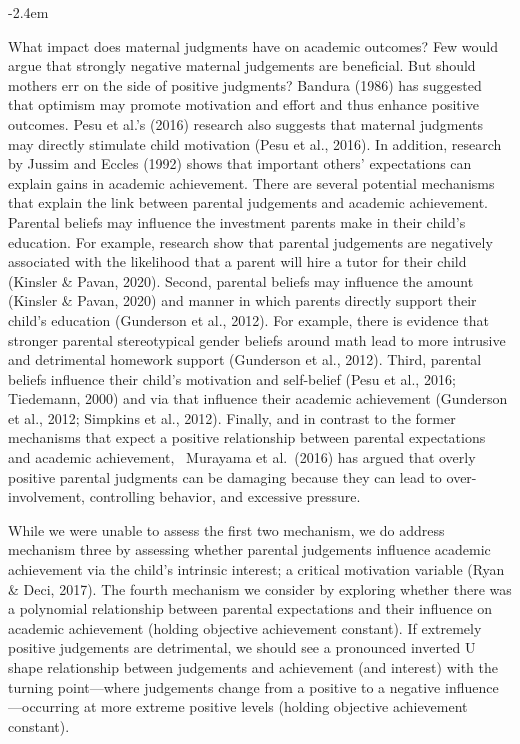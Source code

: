 \documentclass[]{article}
\renewenvironment{quote}{\begin{fquote}\advance\leftmargini -2.4em\begin{oldquote}}{\end{oldquote}\end{fquote}}
\newenvironment{fquote}
  {\def\FrameCommand{
	\fboxsep=0.6em %
	\fcolorbox{black}{white}}%
    \MakeFramed {\advance\hsize-2\width \FrameRestore}
    \begin{minipage}{\linewidth}
  }
  {\end{minipage}\endMakeFramed}
\begin{document}
\begin{quote}
What impact does maternal judgments have on academic outcomes? Few would argue that strongly negative maternal judgements are beneficial. But should mothers err on the side of positive judgments? Bandura (1986) has suggested that optimism may promote motivation and effort and thus enhance positive outcomes. Pesu et al.'s (2016) research also suggests that maternal judgments may directly stimulate child motivation (Pesu et al., 2016). In addition, research by Jussim and Eccles (1992) shows that important others' expectations can explain gains in academic achievement. There are several potential mechanisms that explain the link between parental judgements and academic achievement. Parental beliefs may influence the investment parents make in their child's education. For example, research show that parental judgements are negatively associated with the likelihood that a parent will hire a tutor for their child (Kinsler \& Pavan, 2020). Second, parental beliefs may influence the amount (Kinsler \& Pavan, 2020) and manner in which parents directly support their child's education (Gunderson et al., 2012). For example, there is evidence that stronger parental stereotypical gender beliefs around math lead to more intrusive and detrimental homework support (Gunderson et al., 2012). Third, parental beliefs influence their child's motivation and self-belief (Pesu et al., 2016; Tiedemann, 2000) and via that influence their academic achievement (Gunderson et al., 2012; Simpkins et al., 2012). Finally, and in contrast to the former mechanisms that expect a positive relationship between parental expectations and academic achievement,~ Murayama et al.~(2016) has argued that overly positive parental judgments can be damaging because they can lead to over-involvement, controlling behavior, and excessive pressure.

While we were unable to assess the first two mechanism, we do address mechanism three by assessing whether parental judgements influence academic achievement via the child's intrinsic interest; a critical motivation variable (Ryan \& Deci, 2017). The fourth mechanism we consider by exploring whether there was a polynomial relationship between parental expectations and their influence on academic achievement (holding objective achievement constant). If extremely positive judgements are detrimental, we should see a pronounced inverted U shape relationship between judgements and achievement (and interest) with the turning point---where judgements change from a positive to a negative influence---occurring at more extreme positive levels (holding objective achievement constant).
\end{quote}
\end{document}
